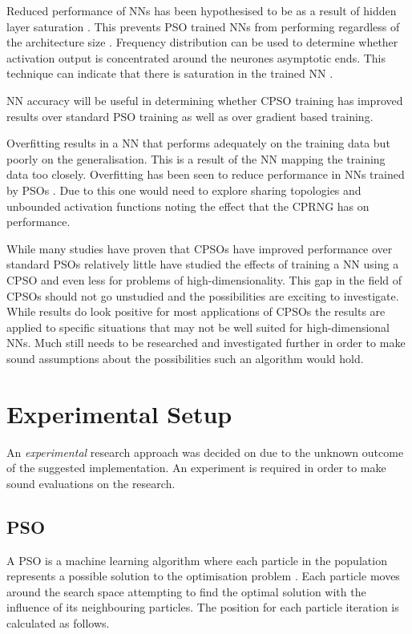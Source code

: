 \documentclass[conference]{IEEEtran}
\begin{document}
Reduced performance of \ac{NN}s has been hypothesised to be as a result of hidden layer saturation \cite{anna:saturation-psonn}\cite{anna:meas-sat-nn}. This prevents \ac{PSO} trained \ac{NN}s from performing regardless of the architecture size \cite{anna:meas-sat-nn}. Frequency distribution can be used to determine whether activation output is concentrated around the neurones asymptotic ends. This technique can indicate that there is saturation in the trained \ac{NN} \cite{anna:meas-sat-nn}.

\ac{NN} accuracy will be useful in determining whether \ac{CPSO} training has improved results over standard \ac{PSO} training as well as over gradient based training.

Overfitting results in a \ac{NN} that performs adequately on the training data but poorly on the generalisation. This is a result of the \ac{NN} mapping the training data too closely. Overfitting has been seen to reduce performance in \ac{NN}s trained by \ac{PSO}s \cite{vanwyk:overfitting-psoffnn}. Due to this one would need to explore sharing topologies and unbounded activation functions noting the effect that the \ac{CPRNG} has on performance.

\noindent While many studies have proven that \ac{CPSO}s have improved performance over standard \ac{PSO}s \cite{pluhacek:cpso-cprng-imp}\cite{pluhacek:ms-cpso}\cite{pluhacek:cpso-esb-chaotic}\cite{pluhacek:cpso-iw}\cite{pluhacek:lozi-cpso-mc} relatively little have studied the effects of training a \ac{NN} using a \ac{CPSO} and even less for problems of high-dimensionality. This gap in the field of \ac{CPSO}s should not go unstudied and the possibilities are exciting to investigate. While results do look positive for most applications of \ac{CPSO}s the results are applied to specific situations that may not be well suited for high-dimensional \ac{NN}s. Much still needs to be researched and investigated further in order to make sound assumptions about the possibilities such an algorithm would hold.



\section{Experimental Setup}
An \emph{experimental} research approach was decided on due to the unknown outcome of the suggested implementation. An experiment is required in order to make sound	evaluations on the research.

	\subsection{PSO}
	A \ac{PSO} is a machine learning algorithm where each particle in the population represents a possible solution to the optimisation problem \cite{anna:meas-sat-nn}. Each particle moves around the search space attempting to find the optimal solution with the influence of its neighbouring particles. The position for each particle iteration is calculated as follows.
\end{document}
